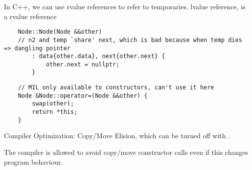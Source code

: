 In C++, we can use rvalue references to refer to temporaries. 
lvalue reference,  is a rvalue reference

\begin{lstlisting}
    Node::Node(Node &&other)
    // n2 and temp `share' next, which is bad because when temp dies => dangling pointer
        : data{other.data}, next{other.next} {
            other.next = nullptr;
        }
\end{lstlisting}

\begin{lstlisting}
    // MIL only available to constructors, can't use it here
    Node &Node::operator=(Node &&other) {
        swap(other);
        return *this;
    }
\end{lstlisting}

Compiler Optimization: Copy/Move Elision, which can be turned off with
.

The compiler is allowed to avoid copy/move constructor calls even if this
changes program behaviour.